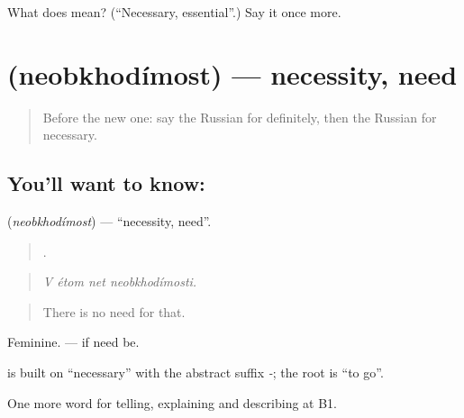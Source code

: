 \begin{tcolorbox}[breakable,colback=teal!4,colframe=teal!35!black,title={Before you move on}]
What does  mean? (\textquotedblleft{}Necessary, essential\textquotedblright{}.) Say it once more.
\end{tcolorbox}
\section[\texorpdfstring{\ru{необходимость} (neobkhodímost)}{необходимость (neobkhodímost)}]{ (neobkhodímost) — necessity, need}

\label{lesson:RU-C375-neobkhodimost}



\begin{quote}
Before the new one: say the Russian for definitely, then the Russian for necessary.
\end{quote}

\subsection*{You'll want to know: }
\textbf{} (\emph{neobkhodímost}) — \textquotedblleft{}necessity, need\textquotedblright{}.

\begin{quote}
   .
\end{quote}

\begin{quote}
\emph{V étom net neobkhodímosti.}
\end{quote}

\begin{quote}
There is no need for that.
\end{quote}

Feminine. \emph{  } — if need be.

\begin{cousinweb}
\textbf{} is built on \emph{} \textquotedblleft{}necessary\textquotedblright{} with the abstract suffix \emph{-}; the root is \emph{} \textquotedblleft{}to go\textquotedblright{}.
\end{cousinweb}

\begin{grammarlens}[title={What you've built}]
One more word for telling, explaining and describing at B1.
\end{grammarlens}

